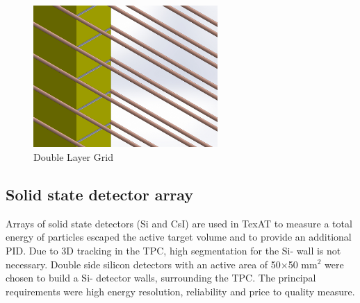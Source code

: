 \documentclass[final,number,sort&compress,5p,times,twocolumn]{elsarticle}
\begin{document}
\begin{figure}[hbt!]
    \centering
    \includegraphics[width=7cm]{Figs/DoubleGrid}
    \caption{Double Layer Grid}
  \label{fig:DoubleGrid}
\end{figure}


\subsection{Solid state detector array \label{Si}}

Arrays of solid state detectors (Si and CsI) are used in TexAT to measure a total energy of particles escaped the active target volume and to provide an additional PID. Due to 3D tracking in the TPC, high segmentation for the Si- wall is not necessary. Double side silicon detectors with an active area of 50$\times$50 mm$^2$ were chosen to build a Si- detector walls, surrounding the TPC. The principal requirements were high energy resolution, reliability and price to quality measure. 
\end{document}

